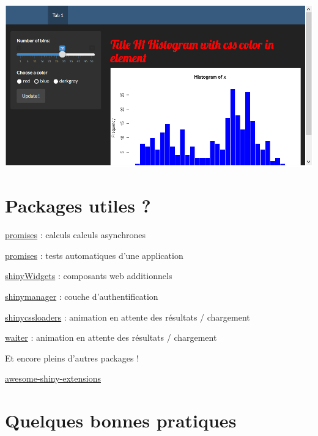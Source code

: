 \documentclass[
]{article}
\begin{document}
\includegraphics{img/css3.png}

\hypertarget{packages-utiles}{%
\section{Packages utiles ?}\label{packages-utiles}}

\href{https://rstudio.github.io/promises/articles/promises_06_shiny.html}{promises}
: calculs calculs asynchrones

\href{https://rstudio.github.io/shinytest2/}{promises} : tests
automatiques d'une application

\href{https://shinyapps.dreamrs.fr/shinyWidgets/}{shinyWidgets} :
composants web additionnels

\href{https://datastorm-open.github.io/shinymanager/}{shinymanager} :
couche d'authentification

\href{https://daattali.com/shiny/shinycssloaders-demo/}{shinycssloaders}
: animation en attente des résultats / chargement

\href{https://waiter.john-coene.com/\#/}{waiter} : animation en attente
des résultats / chargement

Et encore pleins d'autres packages !

\href{https://github.com/nanxstats/awesome-shiny-extensions}{awesome-shiny-extensions}

\hypertarget{quelques-bonnes-pratiques}{%
\section{Quelques bonnes pratiques}\label{quelques-bonnes-pratiques}}
\end{document}
